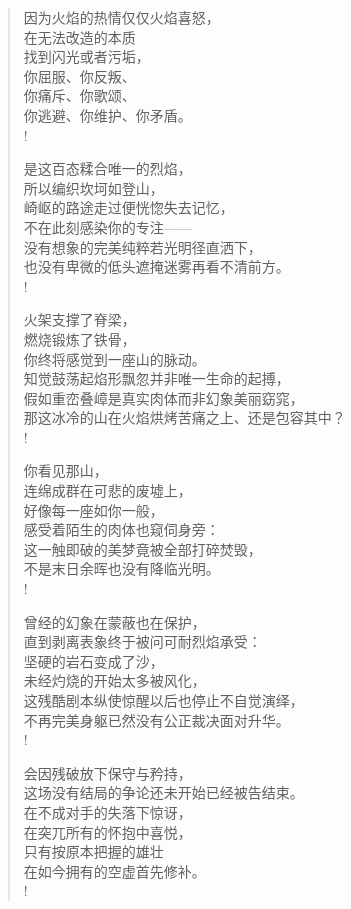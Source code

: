 \documentclass[UTF8, 12pt, a4paper]{ctexrep} %
\begin{document}
\begin{verse}
    因为火焰的热情仅仅火焰喜怒，\\
    在无法改造的本质\\
    找到闪光或者污垢，\\
    你屈服、你反叛、\\
    你痛斥、你歌颂、\\
    你逃避、你维护、你矛盾。\\!

    是这百态糅合唯一的烈焰，\\
    所以编织坎坷如登山，\\
    崎岖的路途走过便恍惚失去记忆，\\
    不在此刻感染你的专注——\\
    没有想象的完美纯粹若光明径直洒下，\\
    也没有卑微的低头遮掩迷雾再看不清前方。\\!

    火架支撑了脊梁，\\
    燃烧锻炼了铁骨，\\
    你终将感觉到一座山的脉动。\\
    知觉鼓荡起焰形飘忽并非唯一生命的起搏，\\
    假如重峦叠嶂是真实肉体而非幻象美丽窈窕，\\
    那这冰冷的山在火焰烘烤苦痛之上、还是包容其中？\\!

    你看见那山，\\
    连绵成群在可悲的废墟上，\\
    好像每一座如你一般，\\
    感受着陌生的肉体也窥伺身旁：\\
    这一触即破的美梦竟被全部打碎焚毁，\\
    不是末日余晖也没有降临光明。\\!

    曾经的幻象在蒙蔽也在保护，\\
    直到剥离表象终于被问可耐烈焰承受：\\
    坚硬的岩石变成了沙，\\
    未经灼烧的开始太多被风化，\\
    这残酷剧本纵使惊醒以后也停止不自觉演绎，\\
    不再完美身躯已然没有公正裁决面对升华。\\!

    会因残破放下保守与矜持，\\
    这场没有结局的争论还未开始已经被告结束。\\
    在不成对手的失落下惊讶，\\
    在突兀所有的怀抱中喜悦，\\
    只有按原本把握的雄壮\\
    在如今拥有的空虚首先修补。\\!


\end{verse}
\end{document}
